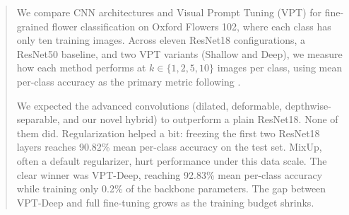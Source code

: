 \begin{abstract}
We compare CNN architectures and Visual Prompt Tuning (VPT) for fine-grained flower classification on Oxford Flowers 102, where each class has only ten training images. Across eleven ResNet18 configurations, a ResNet50 baseline, and two VPT variants (Shallow and Deep), we measure how each method performs at $k \in \{1, 2, 5, 10\}$ images per class, using mean per-class accuracy as the primary metric following \citet{nilsback2008}.

We expected the advanced convolutions (dilated, deformable, depthwise-separable, and our novel hybrid) to outperform a plain ResNet18. None of them did. Regularization helped a bit: freezing the first two ResNet18 layers reaches 90.82\% mean per-class accuracy on the test set. MixUp, often a default regularizer, hurt performance under this data scale. The clear winner was VPT-Deep, reaching 92.83\% mean per-class accuracy while training only 0.2\% of the backbone parameters. The gap between VPT-Deep and full fine-tuning grows as the training budget shrinks.
\end{abstract}
